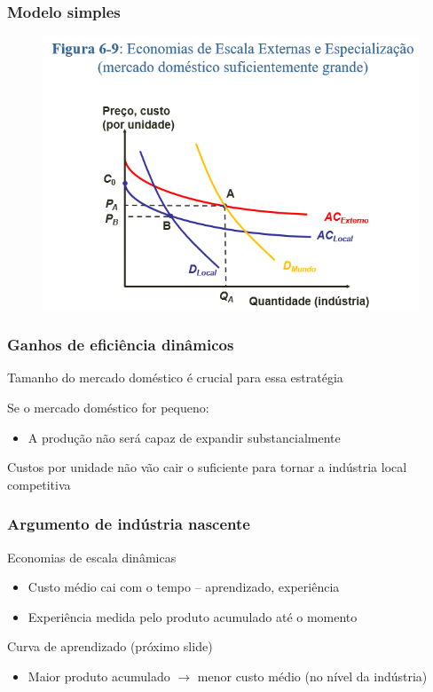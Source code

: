 \documentclass[a4paper,12pt]{article}[abntex2]
\begin{document}
\subsubsection{\textbf{Modelo simples}}

\begin{figure}[H]
    \centering
    \includegraphics[width=0.7\linewidth]{Imagens/a19i1.png}
\end{figure}

\subsubsection{\textbf{Ganhos de eficiência dinâmicos}}

Tamanho do mercado doméstico é crucial para essa estratégia

Se o mercado doméstico for pequeno:\begin{itemize}
      \item A produção não será capaz de expandir substancialmente
    \end{itemize}

Custos por unidade não vão cair o suficiente para tornar a indústria local competitiva

\subsubsection{\textbf{Argumento de indústria nascente}}
Economias de escala dinâmicas  
\begin{itemize}
  \item Custo médio cai com o tempo – aprendizado, experiência
  \item Experiência medida pelo produto acumulado até o momento
\end{itemize}

Curva de aprendizado (próximo slide)  
\begin{itemize}
  \item Maior produto acumulado \(\to\) menor custo médio (no nível da indústria)
\end{itemize}
\end{document}
